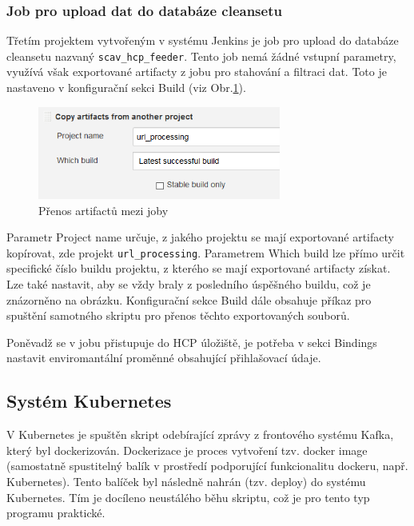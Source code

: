 \documentclass[thesis=M,czech,hidelinks]{FITthesis}[2013/05/06]
\begin{document}
\subsubsection{Job pro upload dat do databáze cleansetu}
Třetím projektem vytvořeným v systému Jenkins je job pro upload do databáze cleansetu nazvaný \texttt{scav_hcp_feeder}. Tento job nemá žádné vstupní parametry, využívá však exportované artifacty z jobu pro stahování a filtraci dat. Toto je nastaveno v konfigurační sekci Build (viz Obr.\ref{fig:jenkins_artifacts}). 

\begin{figure}[h]
	\centering
	\includegraphics[width=8cm]{pictures/jenkins_artifacts.png}
	\caption{Přenos artifactů mezi joby}
	\label{fig:jenkins_artifacts}
\end{figure}

Parametr Project name určuje, z jakého projektu se mají exportované artifacty kopírovat, zde projekt \texttt{url_processing}. Parametrem Which build lze přímo určit specifické číslo buildu projektu, z kterého se mají exportované artifacty získat. Lze také nastavit, aby se vždy braly z posledního úspěšného buildu, což je znázorněno na obrázku. Konfigurační sekce Build dále obsahuje příkaz pro spuštění samotného skriptu pro přenos těchto exportovaných souborů. 

Poněvadž se v jobu přistupuje do HCP úložiště, je potřeba v sekci Bindings nastavit enviromantální proměnné obsahující přihlašovací údaje.



\subsection{Systém Kubernetes}\label{sec:luft}
V Kubernetes je spuštěn skript odebírající zprávy z frontového systému Kafka, který byl dockerizován. Dockerizace je proces vytvoření tzv. docker image (samostatně spustitelný balík v prostředí podporující funkcionalitu dockeru, např. Kubernetes). Tento balíček byl následně nahrán (tzv. deploy) do systému Kubernetes. Tím je docíleno neustálého běhu skriptu, což je pro tento typ programu praktické.
\end{document}
